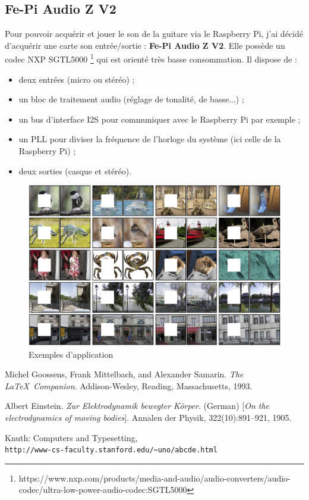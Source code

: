\documentclass[11pt,a4paper]{article}
\begin{document}
\subsection{Fe-Pi Audio Z V2}
Pour pouvoir acquérir et jouer le son de la guitare via le Raspberry Pi, j'ai décidé d'acquérir une carte son entrée/sortie : \textbf{Fe-Pi Audio Z V2}. Elle possède un codec NXP SGTL5000 \footnote{https://www.nxp.com/products/media-and-audio/audio-converters/audio-codec/ultra-low-power-audio-codec:SGTL5000} qui est orienté très basse consommation. Il dispose de : 
\begin{itemize}[noitemsep]
	\item deux entrées (micro ou stéréo) ;
	\item un bloc de traitement audio (réglage de tonalité, de basse...) ;
	\item un bus d'interface I2S pour communiquer avec le Raspberry Pi par exemple ;
	\item un PLL pour diviser la fréquence de l'horloge du système (ici celle de la Raspberry Pi) ;
	\item deux sorties (casque et stéréo).
\end{itemize}

\begin{figure}[H]
	\centering
	\includegraphics[scale=0.2]{teaser.jpg} 
	\caption{Exemples d'application}
\end{figure}




\newpage
\listoffigures
\newpage


\begin{thebibliography}{9}
Michel Goossens, Frank Mittelbach, and Alexander Samarin. 
\textit{The \LaTeX\ Companion}. 
Addison-Wesley, Reading, Massachusetts, 1993.
 
Albert Einstein. 
\textit{Zur Elektrodynamik bewegter K{\"o}rper}. (German) 
[\textit{On the electrodynamics of moving bodies}]. 
Annalen der Physik, 322(10):891–921, 1905.
 
Knuth: Computers and Typesetting,
\\\texttt{http://www-cs-faculty.stanford.edu/\~{}uno/abcde.html}
\end{thebibliography}
\end{document}
